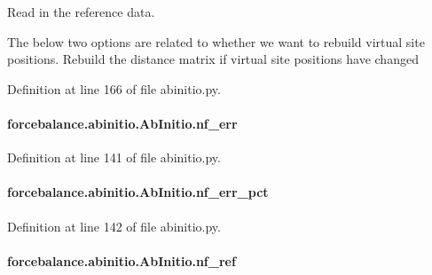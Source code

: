 Read in the reference data. 

The below two options are related to whether we want to rebuild virtual site positions. Rebuild the distance matrix if virtual site positions have changed 

Definition at line 166 of file abinitio.\-py.

\hypertarget{classforcebalance_1_1abinitio_1_1AbInitio_a89de620e9aa500481c9e1ded99e14f72}{
\paragraph[{nf\-\_\-err}]{\setlength{\rightskip}{0pt plus 5cm}forcebalance.\-abinitio.\-Ab\-Initio.\-nf\-\_\-err}}\label{classforcebalance_1_1abinitio_1_1AbInitio_a89de620e9aa500481c9e1ded99e14f72}


Definition at line 141 of file abinitio.\-py.

\hypertarget{classforcebalance_1_1abinitio_1_1AbInitio_a184edac2cb27a999c363595ea59d8163}{
\paragraph[{nf\-\_\-err\-\_\-pct}]{\setlength{\rightskip}{0pt plus 5cm}forcebalance.\-abinitio.\-Ab\-Initio.\-nf\-\_\-err\-\_\-pct}}\label{classforcebalance_1_1abinitio_1_1AbInitio_a184edac2cb27a999c363595ea59d8163}


Definition at line 142 of file abinitio.\-py.

\hypertarget{classforcebalance_1_1abinitio_1_1AbInitio_a5a77f4b99a5b01245ab0435d632122a1}{
\paragraph[{nf\-\_\-ref}]{\setlength{\rightskip}{0pt plus 5cm}forcebalance.\-abinitio.\-Ab\-Initio.\-nf\-\_\-ref}}\label{classforcebalance_1_1abinitio_1_1AbInitio_a5a77f4b99a5b01245ab0435d632122a1}


